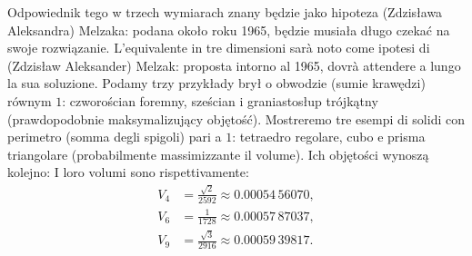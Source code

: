Odpowiednik tego w trzech wymiarach znany będzie jako hipoteza (Zdzisława Aleksandra) Melzaka: podana około roku 1965, będzie musiała długo czekać na swoje rozwiązanie. %
L'equivalente in tre dimensioni sarà noto come ipotesi di (Zdzisław Aleksander) Melzak: proposta intorno al 1965, dovrà attendere a lungo la sua soluzione. %
%
Podamy trzy przykłady brył o obwodzie (sumie krawędzi) równym $1$: czworościan foremny, sześcian i graniastosłup trójkątny (prawdopodobnie maksymalizujący objętość). %
Mostreremo tre esempi di solidi con perimetro (somma degli spigoli) pari a $1$: tetraedro regolare, cubo e prisma triangolare (probabilmente massimizzante il volume). %
Ich objętości wynoszą kolejno: %
I loro volumi sono rispettivamente: %
\begin{align}
    V_4 & = \frac{\sqrt{2}}{2592} \approx 0.00054\,56070, \\
    V_6 & = \frac{1}{1728} \approx 0.00057\,87037, \\
    V_9 & = \frac{\sqrt{3}}{2916} \approx 0.00059\,39817.
\end{align}

%